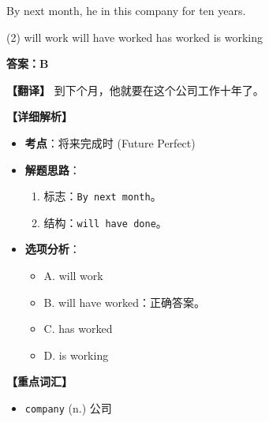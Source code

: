 \documentclass[11pt, a4paper]{article}
\newcommand{\analysis}[4]{
    \begin{solutionbox}
        \textbf{答案：#1}
        
        \textbf{【翻译】} #2
        
        \textbf{【详细解析】}
        #3
        
        \textbf{【重点词汇】}
        #4
    \end{solutionbox}
}
\newcommand{\blank}{\underline{\hspace{1.5cm}}}
\begin{document}
\begin{questions}
    \item By next month, he \blank in this company for ten years.
    \begin{tasks}(2)
        \task will work \task will have worked
        \task has worked \task is working
    \end{tasks}
    \analysis{B}{到下个月，他就要在这个公司工作十年了。}{
        \begin{itemize}
            \item \textbf{考点}：将来完成时 (Future Perfect)
            \item \textbf{解题思路}：
                \begin{enumerate}
                    \item 标志：\texttt{By next month}。
                    \item 结构：\texttt{will have done}。
                \end{enumerate}
            \item \textbf{选项分析}：
                \begin{itemize}
                    \item A. will work
                    \item B. will have worked：正确答案。
                    \item C. has worked
                    \item D. is working
                \end{itemize}
        \end{itemize}
    }{
        \begin{itemize}
            \item \texttt{company} (n.) 公司
        \end{itemize}
    }


\end{questions}
\end{document}
